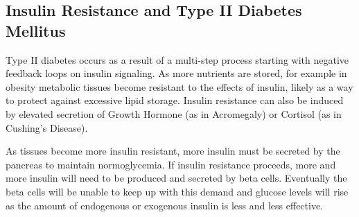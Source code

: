 \documentclass{tufte-handout}
\begin{document}
\subsection{Insulin Resistance and Type II Diabetes Mellitus}

Type II diabetes occurs as a result of a multi-step process starting with negative feedback loops on insulin signaling.  As more nutrients are stored, for example in obesity metabolic tissues become resistant to the effects of insulin, likely as a way to protect against excessive lipid storage.  Insulin resistance can also be induced by elevated secretion of Growth Hormone (as in Acromegaly) or Cortisol (as in Cushing's Disease).

As tissues become more insulin resistant, more insulin must be secreted by the pancreas to maintain normoglycemia.  If insulin resistance proceeds, more and more insulin will need to be produced and secreted by beta cells.  Eventually the beta cells will be unable to keep up with this demand and glucose levels will rise as the amount of endogenous or exogenous insulin is less and less effective.


\listoffigures
\listoftables



\end{document}
